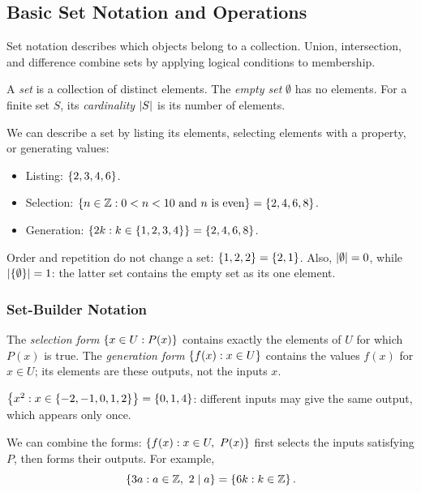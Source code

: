 \subsection{Basic Set Notation and Operations}
Set notation describes which objects belong to a collection. Union,
intersection, and difference combine sets by applying logical conditions
to membership.

\begin{definition}
A \emph{set} is a collection of distinct elements. The \emph{empty set} $\emptyset$ has no elements. For a finite set $S$, its \emph{cardinality} $\left|S\right|$ is its number of elements.
\end{definition}
We can describe a set by listing its elements, selecting elements with a property, or generating values:
\begin{itemize}
    \item Listing: $\left\{2,3,4,6\right\}$.
    \item Selection: $\left\{n\in\mathbb{Z} : 0<n<10 \text{ and } n \text{ is even}\right\}=\left\{2,4,6,8\right\}$.
    \item Generation: $\left\{2k : k\in\left\{1,2,3,4\right\}\right\}=\left\{2,4,6,8\right\}$.
\end{itemize}
\begin{example}
Order and repetition do not change a set: $\left\{1,2,2\right\}=\left\{2,1\right\}$. Also, $\left|\emptyset\right|=0$, while $\left|\left\{\emptyset\right\}\right|=1$: the latter set contains the empty set as its one element.
\end{example}

\subsubsection{Set-Builder Notation}
\begin{definition}
The \emph{selection form} $\left\{x\in U : P(x)\right\}$ contains exactly the elements of $U$ for which $P(x)$ is true. The \emph{generation form} $\left\{f(x) : x\in U\right\}$ contains the values $f(x)$ for $x\in U$; its elements are these outputs, not the inputs $x$.
\end{definition}
\begin{example}
    $\left\{x^2 : x\in\left\{-2,-1,0,1,2\right\}\right\}=\left\{0,1,4\right\}$: different inputs may give the same output, which appears only once.
\end{example}
We can combine the forms: $\left\{f(x) : x\in U,\ P(x)\right\}$ first selects the inputs satisfying $P$, then forms their outputs. For example,
\[
    \left\{3a : a\in\mathbb{Z},\ 2\mid a\right\}=\left\{6k : k\in\mathbb{Z}\right\}.
\]

